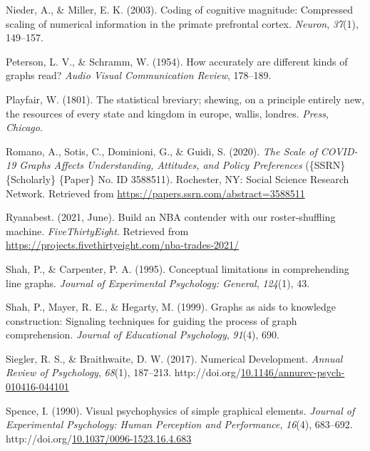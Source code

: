 \documentclass[print]{nuthesis}
\newlength{\cslhangindent}
\newenvironment{CSLReferences}%
{\setlength{\parindent}{0pt}%
\everypar{\setlength{\hangindent}{\cslhangindent}}\ignorespaces}%
{\par}
\begin{document}
\begin{CSLReferences}{1}{0}
\leavevmode\hypertarget{ref-nieder2003coding}{}%
Nieder, A., \& Miller, E. K. (2003). Coding of cognitive magnitude: Compressed scaling of numerical information in the primate prefrontal cortex. \emph{Neuron}, \emph{37}(1), 149--157.

\leavevmode\hypertarget{ref-peterson1954accurately}{}%
Peterson, L. V., \& Schramm, W. (1954). How accurately are different kinds of graphs read? \emph{Audio Visual Communication Review}, 178--189.

\leavevmode\hypertarget{ref-playfair1801statistical}{}%
Playfair, W. (1801). The statistical breviary; shewing, on a principle entirely new, the resources of every state and kingdom in europe, wallis, londres. \emph{Press, Chicago}.

\leavevmode\hypertarget{ref-romano_scale_2020}{}%
Romano, A., Sotis, C., Dominioni, G., \& Guidi, S. (2020). \emph{The {Scale} of {COVID}-19 {Graphs} {Affects} {Understanding}, {Attitudes}, and {Policy} {Preferences}} (\{SSRN\} \{Scholarly\} \{Paper\} No. ID 3588511). Rochester, NY: Social Science Research Network. Retrieved from \url{https://papers.ssrn.com/abstract=3588511}

\leavevmode\hypertarget{ref-ryanabest_2021}{}%
Ryanabest. (2021, June). Build an NBA contender with our roster-shuffling machine. \emph{FiveThirtyEight}. Retrieved from \url{https://projects.fivethirtyeight.com/nba-trades-2021/}

\leavevmode\hypertarget{ref-shah1995conceptual}{}%
Shah, P., \& Carpenter, P. A. (1995). Conceptual limitations in comprehending line graphs. \emph{Journal of Experimental Psychology: General}, \emph{124}(1), 43.

\leavevmode\hypertarget{ref-shah1999graphs}{}%
Shah, P., Mayer, R. E., \& Hegarty, M. (1999). Graphs as aids to knowledge construction: Signaling techniques for guiding the process of graph comprehension. \emph{Journal of Educational Psychology}, \emph{91}(4), 690.

\leavevmode\hypertarget{ref-siegler_numerical_2017}{}%
Siegler, R. S., \& Braithwaite, D. W. (2017). Numerical {Development}. \emph{Annual Review of Psychology}, \emph{68}(1), 187--213. http://doi.org/\href{https://doi.org/10.1146/annurev-psych-010416-044101}{10.1146/annurev-psych-010416-044101}

\leavevmode\hypertarget{ref-spence_visual_1990}{}%
Spence, I. (1990). Visual psychophysics of simple graphical elements. \emph{Journal of Experimental Psychology: Human Perception and Performance}, \emph{16}(4), 683--692. http://doi.org/\href{https://doi.org/10.1037/0096-1523.16.4.683}{10.1037/0096-1523.16.4.683}


\end{CSLReferences}
\end{document}
